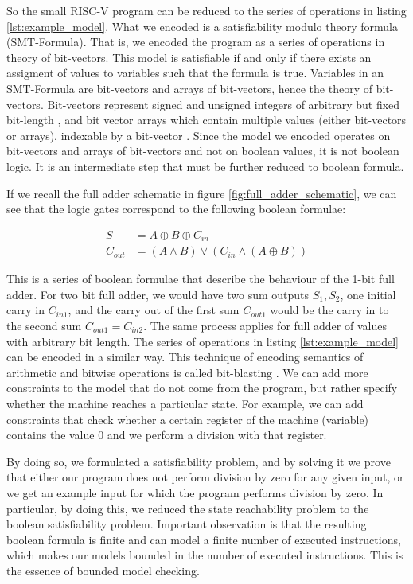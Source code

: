 \documentclass[12pt]{article}
\begin{document}
So the small RISC-V program can be reduced to the series of operations in
listing \ref{lst:example_model}. What we encoded is a satisfiability modulo
theory formula (SMT-Formula). That is, we encoded the program as a series of
operations in theory of bit-vectors. This model is satisfiable if and only if
there exists an assigment of values to variables such that the formula is true.
Variables in an SMT-Formula are bit-vectors and arrays of bit-vectors, hence
the theory of bit-vectors. Bit-vectors represent signed and unsigned integers
of arbitrary but fixed bit-length \cite{de2009satisfiability}, and bit vector
arrays which contain multiple values (either bit-vectors or arrays), indexable
by a bit-vector \cite{btor2}. Since the model we encoded operates on
bit-vectors and arrays of bit-vectors and not on boolean values, it is not
boolean logic. It is an intermediate step that must be further reduced to
boolean formula.

If we recall the full adder schematic in figure \ref{fig:full_adder_schematic},
we can see that the logic gates correspond to the following boolean formulae:

\begin{align*}
    S	    &= A \oplus B \oplus C_{in} \\
    C_{out} &= (A \land B) \lor (C_{in} \land (A \oplus B))
\end{align*}

This is a series of boolean formulae that describe the behaviour of the 1-bit
full adder. For two bit full adder, we would have two sum outputs $S_1, S_2$,
one initial carry in $C_{in1}$, and the carry out of the first sum $C_{out1}$
would be the carry in to the second sum $C_{out1} = C_{in2}$. The same process
applies for full adder of values with arbitrary bit length. The series of
operations in listing \ref{lst:example_model} can be encoded in a similar
way. This technique of encoding semantics of arithmetic and bitwise operations
is called bit-blasting \cite{barrett2021satisfiability}. We can add more
constraints to the model that do not come from the program, but rather specify
whether the machine reaches a particular state. For example, we can add
constraints that check whether a certain register of the machine (variable)
contains the value $0$ and we perform a division with that register. 

By doing so, we formulated a satisfiability problem, and by solving it we prove
that either our program does not perform division by zero for any given input,
or we get an example input for which the program performs division by zero. In
particular, by doing this, we reduced the state reachability problem to the
boolean satisfiability problem. Important observation is that the resulting 
boolean formula is finite and can model a finite number of executed
instructions, which makes our models bounded in the number of executed
instructions. This is the essence of bounded model checking.
\end{document}
